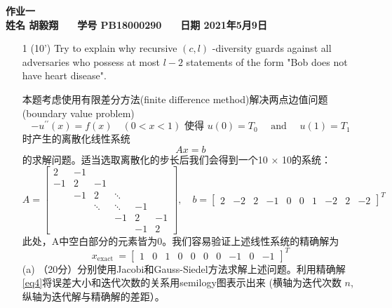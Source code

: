 \documentclass[12pt,a4paper,UTF8]{ctexart}
\begin{document}


\begin{center}
    \textbf{作业一}\\
    \textbf{姓名 胡毅翔 ~~ 学号 PB18000290 ~~ 日期 2021年5月9日}\\
\end{center}

\vspace{1cm}

\begin{enumerate}
    \item[1] 
(10') Try to explain why recursive $(c, l)$ -diversity guards against all adversaries who possess at most $l-2$ statements of the form "Bob does not have heart disease".


          本题考虑使用有限差分方法(finite difference method)解决两点边值问题(boundary
          value problem)
          \begin{equation}
              -u^{\prime \prime}(x)=f(x) \quad(0<x<1) \text { 使得 } u(0)=T_{0} \quad \text { and } \quad u(1)=T_{1}
          \end{equation}
          时产生的离散化线性系统
          \begin{equation}
              A x=b
          \end{equation}
          的求解问题。适当选取离散化的步长后我们会得到一个10 × 10的系统：
          \begin{equation}
              A=\left[\begin{array}{rrrrrrrr}
                      2  & -1 &        &        &    &    \\
                      -1 & 2  & -1     &        &    &    \\
                         & -1 & 2      & \ddots &    &    \\
                         &    & \ddots & \ddots & -1 &    \\
                         &    &        & -1     & 2  & -1 \\
                         &    &        &        & -1 & 2
                  \end{array}\right], \quad b=\left[\begin{array}{llllllllll}
                      2 & -2 & 2 & -1 & 0 & 0 & 1 & -2 & 2 & -2
                  \end{array}\right]^{T}
          \end{equation}
          此处，A中空白部分的元素皆为0。我们容易验证上述线性系统的精确解为
          \begin{equation}\label{eq4}
              x_{\text {exact }}=\left[\begin{array}{llllllllll}
                      1 & 0 & 1 & 0 & 0 & 0 & 0 & -1 & 0 & -1
                  \end{array}\right]^{T}
          \end{equation}
          (a) （20分）分别使用Jacobi和Gauss-Siedel方法求解上述问题。利用精确解\eqref{eq4}将误差大小和迭代次数的关系用semilogy图表示出来 (横轴为迭代次数 $n$, 纵轴为迭代解与精确解的差距）。


\end{enumerate}
\end{document}
